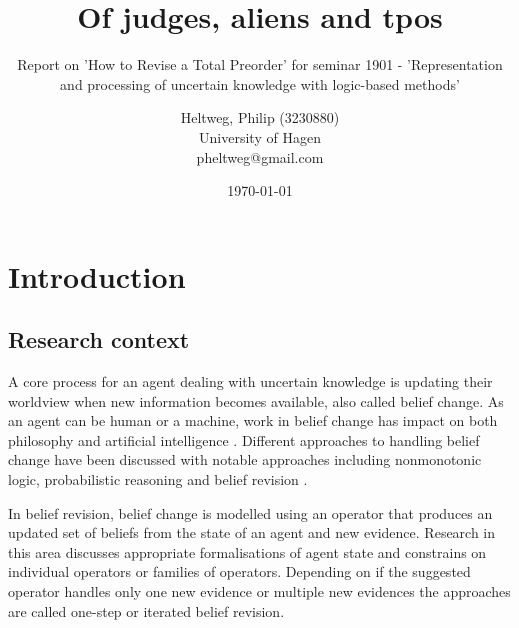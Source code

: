 \documentclass[english, 12pt]{scrartcl}
\theoremstyle{definition}
\theoremstyle{definition}
\theoremstyle{definition}
\begin{document}
\title{Of judges, aliens and tpos}
\subtitle{Report on 'How to Revise a Total Preorder' \cite{Booth2011} for seminar 1901 - 'Representation and processing of uncertain knowledge with logic-based methods'}
\author{
	Heltweg, Philip (3230880) \\
	University of Hagen \\
	pheltweg@gmail.com
}
\date{\today}
\maketitle


\newpage

\tableofcontents

\newpage

\section{Introduction}



\subsection{Research context}
A core process for an agent dealing with uncertain knowledge is updating their worldview when new information becomes available, also called belief change. As an agent can be human or a machine, work in belief change has impact on both philosophy and artificial intelligence \cite{Ferme2011}. Different approaches to handling belief change have been discussed with notable approaches including nonmonotonic logic, probabilistic reasoning and belief revision \cite{Darwiche1997}.

In belief revision, belief change is modelled using an operator that produces an updated set of beliefs from the state of an agent and new evidence. Research in this area discusses appropriate formalisations of agent state and constrains on individual operators or families of operators. Depending on if the suggested operator handles only one new evidence or multiple new evidences the approaches are called one-step or iterated belief revision.
\end{document}
